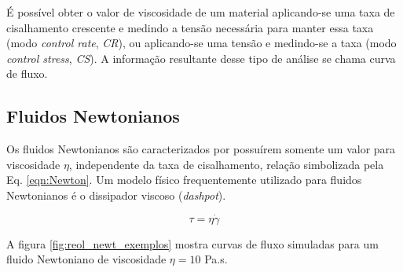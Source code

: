 			É possível obter o valor de viscosidade de um material aplicando-se uma taxa de cisalhamento crescente e medindo a tensão necessária para manter essa taxa (modo \emph{control rate}, \emph{CR}), ou aplicando-se uma tensão e medindo-se a taxa (modo \emph{control stress}, \emph{CS}). A informação resultante desse tipo de análise se chama curva de fluxo. 
						
			\subsection{Fluidos Newtonianos}
			
			Os fluidos Newtonianos são caracterizados por possuírem somente um valor para viscosidade \(\eta\), independente da taxa de cisalhamento, relação simbolizada pela Eq. \ref{eqn:Newton}. Um modelo físico frequentemente utilizado para fluidos Newtonianos é o dissipador viscoso (\emph{dashpot}).
			
			\begin{equation}
				\tau = \eta\dot{\gamma}
				\label{eqn:Newton}
			\end{equation}  
			
			A figura \ref{fig:reol_newt_exemplos} mostra curvas de fluxo simuladas para um fluido Newtoniano de viscosidade \(\eta=10\) Pa.s\menosUm.
			

